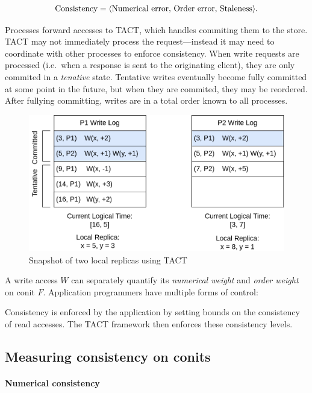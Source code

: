 \documentclass[]             %
{NASA}                       %
\theoremstyle{definition}
\begin{document}
\[\textrm{Consistency} = \langle \textrm{Numerical error, \textrm{Order error}, \textrm{Staleness}} \rangle.\]

Processes forward accesses to TACT, which handles commiting them to the
store. TACT may not immediately process the request---instead it may
need to coordinate with other processes to enforce consistency. When
write requests are processed (i.e.~when a response is sent to the
originating client), they are only commited in a \emph{tenative} state.
Tentative writes eventually become fully committed at some point in the
future, but when they are commited, they may be reordered. After
fullying committing, writes are in a total order known to all processes.

\begin{figure}[h]
  \center
  \includegraphics[scale=0.4]{images/TACT Logs.png}
  \caption{Snapshot of two local replicas using TACT}
  \label{fig:tact_logs}
\end{figure}

A write access \(W\) can separately quantify its \emph{numerical weight}
and \emph{order weight} on conit \(F\). Application programmers have
multiple forms of control:

Consistency is enforced by the application by setting bounds on the
consistency of read accesses. The TACT framework then enforces these
consistency levels.

\hypertarget{measuring-consistency-on-conits}{%
  \subsection{Measuring consistency on
    conits}\label{measuring-consistency-on-conits}}

\hypertarget{numerical-consistency}{%
  \paragraph{Numerical consistency}\label{numerical-consistency}}
\end{document}
